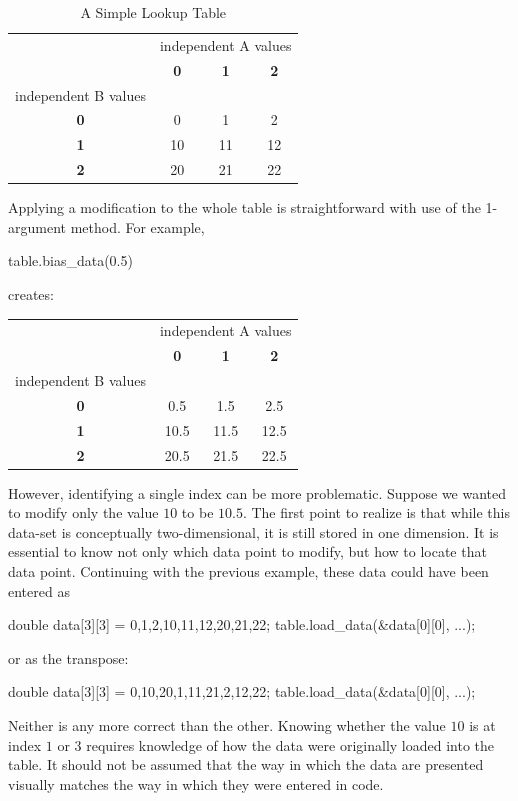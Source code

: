 \documentclass[11pt,fleqn]{report}
\begin{document}
\begin{table}[h!]
\caption{A Simple Lookup Table}
\begin{center}
\begin{tabular}{||c||c|c|c||}
\hline \hline
 & \multicolumn{3}{c}{independent A values} \\
 & \textbf{0} &\textbf{1} &\textbf{2}\\
independent B values & & & \\
\hline
\textbf{0} &  0 &  1 &  2 \\
\textbf{1} & 10 & 11 & 12 \\
\textbf{2} & 20 & 21 & 22 \\
\hline \hline
\end{tabular}
\end{center}
\end{table}

Applying a modification to the whole table is straightforward with use of the
1-argument method.  For example,
\begin{code}
table.bias_data(0.5)
\end{code}
creates:
\begin{table}[h!]
\begin{center}
\begin{tabular}{||c||c|c|c||}
\hline \hline
 & \multicolumn{3}{c}{independent A values} \\
 & \textbf{0} &\textbf{1} &\textbf{2}\\
independent B values & & & \\
\hline \hline
\textbf{0} &  0.5 &  1.5 &  2.5 \\
\textbf{1} & 10.5 & 11.5 & 12.5 \\
\textbf{2} & 20.5 & 21.5 & 22.5 \\
\hline \hline
\end{tabular}
\end{center}
\end{table}

However, identifying a single index can be more problematic.
Suppose we wanted to modify only the value $10$ to be $10.5$.
The first point to realize is that while this
data-set is conceptually two-dimensional, it is still stored in one
dimension. It is essential to know not only which data point to modify,
but how to locate that data point.  Continuing with the previous example,
these data could have been entered as
\begin{code}
double data[3][3] = {{0,1,2},{10,11,12},{20,21,22}};
table.load_data(&data[0][0], ...);
\end{code}
or as the transpose:
\begin{code}
double data[3][3] = {{0,10,20},{1,11,21},{2,12,22}};
table.load_data(&data[0][0], ...);
\end{code}
Neither is any more correct than the other.  Knowing
whether the value $10$ is at index $1$ or $3$ requires knowledge of how
the data were
originally loaded into the table.  It should not be assumed
that the way in which the
data are presented visually matches the way in
which they were entered in code.
\end{document}
